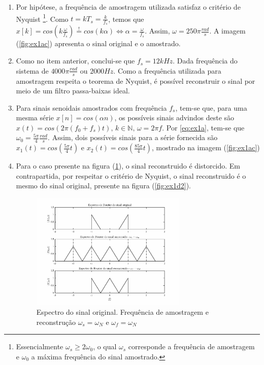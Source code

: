     \begin{enumerate}

        \item %
        
        Por hipótese, a frequência de amostragem utilizada satisfaz o critério de Nyquist \footnote{Essencialmente $\omega_s \geq 2\omega_0$, o qual $\omega_s$ corresponde a frequência de amostragem e $\omega_0$ a máxima frequência do sinal amostrado.}. Como $t = kT_s = \frac{k}{f_s}$, temos que $x[k] = cos(k \frac{\omega}{f_s})  \stackrel{!}{=} cos(k \alpha) \Longleftrightarrow \alpha = \frac{\omega}{f_s}$. Assim, $\omega = 250\pi \frac{rad}{s}$. A imagem (\ref{fig:ex1ac}) apresenta o sinal original e o amostrado.
        
        \item %
        
        Como no item anterior, conclui-se que $f_s = 12 kHz$. Dada frequência do sistema de $4000\pi \frac{rad}{s}$ ou $2000 Hz$. Como a frequência utilizada para amostragem respeita o teorema de Nyquist, é possível reconstruir o sinal por meio de um filtro passa-baixas ideal. 
        
        \item %
        Para sinais senoidais amostrados com frequência $f_s$, tem-se que, para uma mesma série $x[n] = cos(\alpha n)$, os possíveis sinais advindos deste são $x(t) = cos(2 \pi (f_0 + f_s)t) \mbox{, } k \in \mathbb{N} \mbox{, } \omega = 2 \pi f$. Por \eqref{eq:ex1a}, tem-se que $\omega_0 = \frac{5\pi}{4} \frac{rad}{s}$. Assim, dois possíveis sinais para a série fornecida são $x_1(t) = cos(\frac{5\pi}{4} t )$ e $x_2(t) = cos(\frac{85\pi}{4} t)$, mostrado na imagem (\ref{fig:ex1ac}) 
        
        \item %
        
        Para o caso presente na figura (\ref{fig:ex1d1}), o sinal reconstruido é distorcido. Em contrapartida, por respeitar o critério de Nyquist, o sinal reconstruido é o mesmo do sinal original, presente na figura (\ref{fig:ex1d2}).
        
        \newpage

        \begin{figure}[H]
            \centering
            \includegraphics[width=0.7\textwidth]{./images/ex1d1.eps}
            \caption{Espectro do sinal original. Frequência de amostragem e reconstrução $\omega_s = \omega_N$ e $\omega_f = \omega_N$}
            \label{fig:ex1d1}
        \end{figure}%
    

\end{enumerate}
